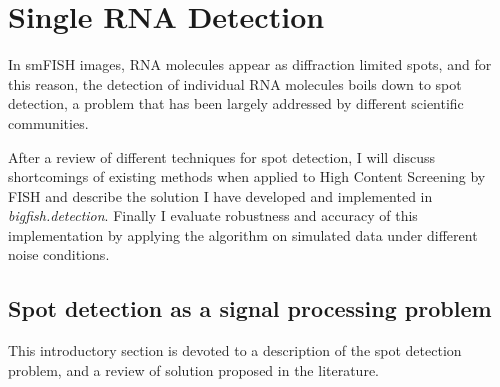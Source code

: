 
\graphicspath{{./figures/chapter2/}}


\chapter{Single RNA Detection}
\label{ch:chapter2}

\minitoc
\newpage


In smFISH images, RNA molecules appear as diffraction limited spots, and for this reason, the detection of individual RNA molecules boils down to spot detection, a problem that has been largely addressed by different scientific communities. 

After a review of different techniques for spot detection, I will discuss shortcomings of existing methods when applied to High Content Screening by \ac{FISH} and describe the solution I have developed and implemented in \mbox{\emph{bigfish.detection}}.
Finally I evaluate robustness and accuracy of this implementation by applying the algorithm on simulated data under different noise conditions.

\section{Spot detection as a signal processing problem}
\label{sec:detection_introduction}

This introductory section is devoted to a description of the spot detection problem, and a review of solution proposed in the literature.  


